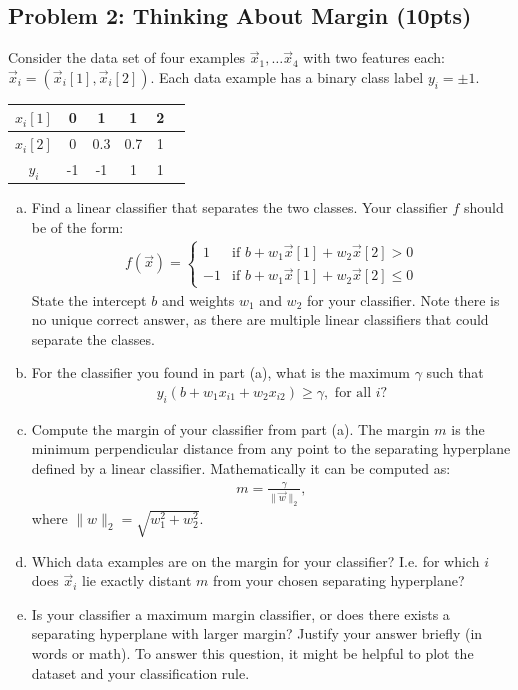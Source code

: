 \documentclass[10pt]{article}
\begin{document}
\subsection{Problem 2: Thinking About Margin (10pts)}
Consider the data set of four examples $\vec{x}_1, \ldots \vec{x}_4$ with two features each: $\vec{x}_i = (\vec{x}_i[1], \vec{x}_i[2])$. Each data example has a binary class
label $y_i=\pm 1$.

\begin{center}
	\begin{tabular}{|c|c|c|c|c|c|} \hline
		$x_{i}[1]$ & 0 & 1 & 1 & 2 \\ \hline
		$x_{i}[2]$ & 0 & 0.3 & 0.7 & 1 \\ \hline
		$y_i$ & -1 & -1 & 1 & 1 \\ \hline
	\end{tabular}
\end{center}

\begin{enumerate}[(a)]
	\item Find a linear classifier that separates the two classes.
	Your classifier $f$ should be of the form:
	\begin{align*}
	f(\vec{x}) = \begin{cases}
	1 & \text{if } b + w_1 \vec{x}[1] + w_2 \vec{x}[2] > 0 \\
	-1 & \text{if } b + w_1 \vec{x}[1] + w_2 \vec{x}[2] \leq 0
	\end{cases}
	\end{align*}
	State the intercept $b$ and weights $w_1$ and $w_2$ for your classifier.
	Note there is no unique correct answer, as there are multiple linear classifiers
	that could separate the classes.
	
	\item For the classifier you found in part (a), what is the maximum $\gamma$ such that
	\begin{align*}
	y_i(b+w_1x_{i1} + w_{2}x_{i2}) \geq \gamma, \mbox{ for all } i?
	\end{align*}
	
	\item Compute the margin of your classifier from part (a). The margin $m$ is the minimum perpendicular distance from any point to the separating hyperplane defined by a linear classifier. Mathematically it can be computed as:
	\begin{align*}
	m = \frac{\gamma}{\|\vec{w}\|_2},
	\end{align*}
	where $\|w\|_2 = \sqrt{w_1^2 + w_2^2}$.
	
	\item Which data examples are on the margin for your classifier? I.e. for which $i$ does $\vec{x}_i$ lie exactly distant $m$ from your chosen separating hyperplane?	
	
	\item Is your classifier a maximum margin classifier, or does there exists a separating hyperplane with larger margin? Justify your answer briefly (in words or math). To answer this question, it might be helpful to plot the dataset and your classification rule. 
\end{enumerate}
\end{document}

